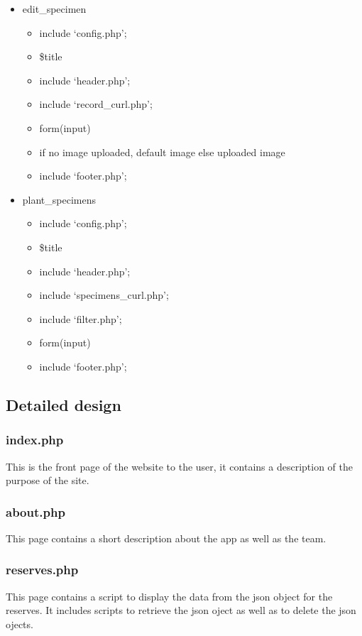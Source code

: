 \begin{itemize}
        \item edit\_specimen
        \begin{itemize}
            \item include `config.php';
            \item \$title
            \item include `header.php';
            \item include `record\_curl.php';
            \item form(input)
            \item if no image uploaded, default image else uploaded image
            \item include `footer.php';
        \end{itemize}
        
        \item plant\_specimens
        \begin{itemize}
            \item include `config.php';
            \item \$title
            \item include `header.php';
            \item include `specimens\_curl.php';
            \item include `filter.php';
            \item form(input)
            \item include `footer.php';
        \end{itemize}
    \end{itemize}


\subsection{Detailed design}

    \subsubsection{index.php}
        This is the front page of the website to the user, it contains a description of the purpose of the site.

        
    \subsubsection{about.php}
        This page contains a short description about the app as well as the team.

        
    \subsubsection{reserves.php}
        This page contains a script to display the data from the json object for the reserves. It includes scripts to retrieve the json oject as well as to delete the json ojects.

